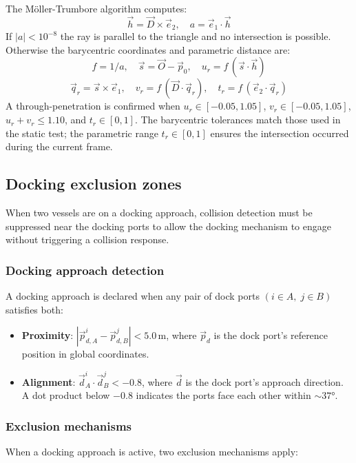 \documentclass[Orbiter Technical Reference.tex]{subfiles}
\begin{document}
The M\"oller-Trumbore algorithm computes:
\begin{equation*}
\vec{h} = \vec{D} \times \vec{e}_2, \quad
a = \vec{e}_1 \cdot \vec{h}
\end{equation*}
If $|a| < 10^{-8}$ the ray is parallel to the triangle and no intersection
is possible.  Otherwise the barycentric coordinates and parametric distance
are:
\begin{equation*}
f = 1/a, \quad
\vec{s} = \vec{O} - \vec{p}_0, \quad
u_r = f\,(\vec{s} \cdot \vec{h})
\end{equation*}
\begin{equation*}
\vec{q}_r = \vec{s} \times \vec{e}_1, \quad
v_r = f\,(\vec{D} \cdot \vec{q}_r), \quad
t_r = f\,(\vec{e}_2 \cdot \vec{q}_r)
\end{equation*}
A through-penetration is confirmed when $u_r \in [-0.05, 1.05]$,
$v_r \in [-0.05, 1.05]$, $u_r + v_r \le 1.10$, and $t_r \in [0, 1]$.
The barycentric tolerances match those used in the static test;
the parametric range $t_r \in [0,1]$ ensures the intersection occurred
during the current frame.


\subsection{Docking exclusion zones}
\label{ssec:dock_exclusion}
When two vessels are on a docking approach, collision detection must be
suppressed near the docking ports to allow the docking mechanism to
engage without triggering a collision response.

\subsubsection{Docking approach detection}
A docking approach is declared when any pair of dock ports
$(i \in A,\; j \in B)$ satisfies both:
\begin{itemize}
\item \textbf{Proximity}: $|\vec{p}_{d,A}^i - \vec{p}_{d,B}^j| < 5.0$\,m,
  where $\vec{p}_{d}$ is the dock port's reference position in global
  coordinates.
\item \textbf{Alignment}: $\vec{d}_{A}^i \cdot \vec{d}_{B}^j < -0.8$,
  where $\vec{d}$ is the dock port's approach direction.  A dot product
  below $-0.8$ indicates the ports face each other within $\sim\!37°$.
\end{itemize}

\subsubsection{Exclusion mechanisms}
When a docking approach is active, two exclusion mechanisms apply:
\end{document}
